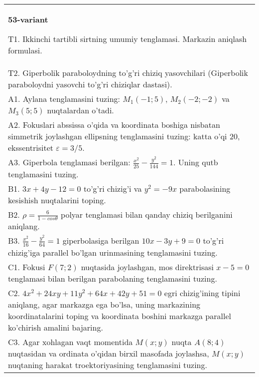 \documentclass{article}
\begin{document}
\begin{tabular}{m{17cm}}
\textbf{53-variant}
\newline

T1. Ikkinchi tartibli sirtning umumiy tenglamasi. Markazin aniqlash formulasi.\\

T2. Giperbolik paraboloydning to'g'ri chiziq yasovchilari (Giperbolik paraboloydni yasovchi to'g'ri chiziqlar dastasi).\\

A1. Aylana tenglamasini tuzing: $M_1(-1;5)$, $M_2(-2;-2)$ va $M_3(5;5)$ nuqtalardan o'tadi.\\

A2. Fokuslari abssissa o'qida va koordinata boshiga nisbatan simmetrik joylashgan ellipsning tenglamasini tuzing: katta o'qi $20$, ekssentrisitet $\varepsilon=3/5$.\\

A3. Giperbola tenglamasi berilgan: $\frac{x^{2}}{25}-\frac{y^{2}}{144}=1$. Uning qutb tenglamasini tuzing.\\

B1. $3x + 4y - 12 = 0$ to'g'ri chizig'i va $y^{2} = - 9x$ parabolasining kesishish nuqtalarini toping.\\

B2. $\rho = \frac{6}{1 - cos\theta}$ polyar tenglamasi bilan qanday chiziq berilganini aniqlang.  \\

B3. $\frac{x^{2}}{16} - \frac{y^{2}}{64} = 1$ giperbolasiga berilgan $10x - 3y + 9 = 0$ to'g'ri chizig'iga parallel bo'lgan urinmasining tenglamasini tuzing.  \\

C1. Fokusi $F(7;2)$ nuqtasida joylashgan, mos direktrisasi $x - 5 = 0$ tenglamasi bilan berilgan parabolaning tenglamasini tuzing.  \\

C2. $4x^{2} + 24xy + 11y^{2} + 64x + 42y + 51 = 0$ egri chizig'ining tipini aniqlang, agar markazga ega bo'lsa, uning markazining koordinatalarini toping va koordinata boshini markazga parallel ko'chirish amalini bajaring.\\

C3. Agar xohlagan vaqt momentida $M(x;y)$ nuqta $A(8;4)$ nuqtasidan va ordinata o'qidan birxil masofada joylashsa, $M(x;y)$ nuqtaning harakat troektoriyasining tenglamasini tuzing.  \\

\end{tabular}
\vspace{1cm}
\end{document}
